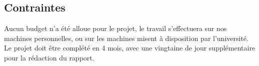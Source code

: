 \subsection{Contraintes}
Aucun budget n'a été alloue pour le projet, le travail s'effectuera sur nos machines personnelles, ou sur les machines misent à disposition par l'université.\\
Le projet doit être complété en 4 mois, avec une vingtaine de jour supplémentaire pour la rédaction du rapport.\\


\clearpage